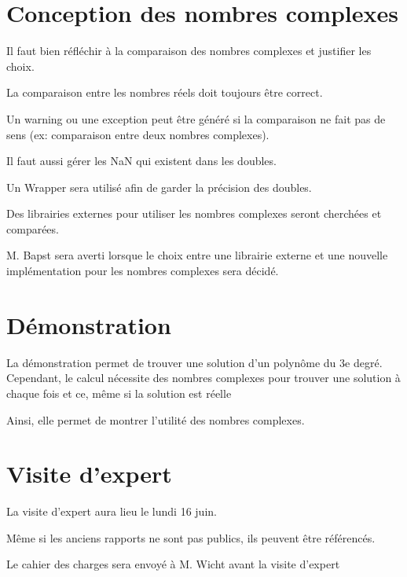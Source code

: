 \documentclass[11pt]{meetingmins}
\begin{document}
\section{Conception des nombres complexes}
\begin{hiddenitems}
    \item Il faut bien réfléchir à la comparaison des nombres complexes et justifier les choix.
    \item La comparaison entre les nombres réels doit toujours être correct.
    \item Un warning ou une exception peut être généré si la comparaison ne fait pas de sens (ex: comparaison entre deux nombres complexes).
    \item Il faut aussi gérer les NaN qui existent dans les doubles.
    \item Un Wrapper sera utilisé afin de garder la précision des doubles.
    \item Des librairies externes pour utiliser les nombres complexes seront cherchées et comparées.
    \item M. Bapst sera averti lorsque le choix entre une librairie externe et une nouvelle implémentation pour les nombres complexes sera décidé.
\end{hiddenitems}

\section{Démonstration}
\begin{hiddenitems}
    \item La démonstration permet de trouver une solution d'un polynôme du 3e degré. Cependant, le calcul nécessite des nombres complexes pour trouver une solution à chaque fois et ce, même si la solution est réelle
    \item Ainsi, elle permet de montrer l'utilité des nombres complexes.
\end{hiddenitems}

\section{Visite d'expert}
\begin{hiddenitems}
    \item La visite d'expert aura lieu le lundi 16 juin.
    \item Même si les anciens rapports ne sont pas publics, ils peuvent être référencés.
    \item Le cahier des charges sera envoyé à M. Wicht avant la visite d'expert
\end{hiddenitems}
\end{document}
